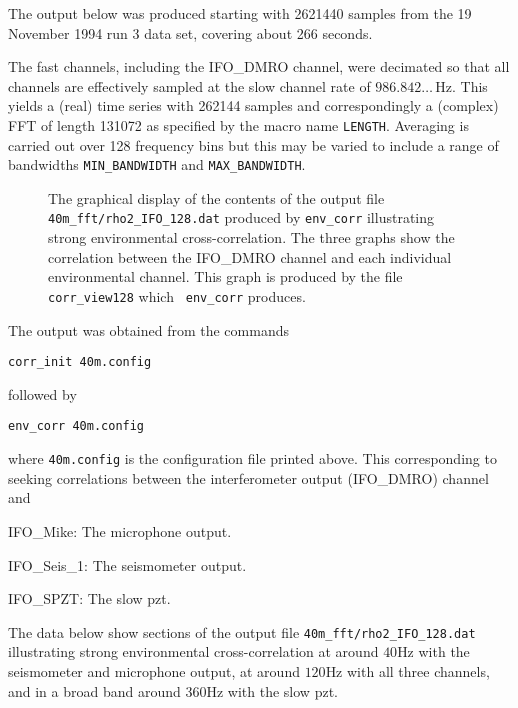  

The output below was produced starting with  2621440 samples from the 19
November 1994 run 3 data set, covering about 266 seconds.

The fast channels, including the IFO\_DMRO channel, were decimated
so that all channels are effectively sampled at the slow channel rate
of $986.842\dots\,$Hz. This yields a (real) time series with 262144
samples and correspondingly a (complex) FFT of length 131072 as
specified by the macro name {\tt LENGTH}.
Averaging is carried out over 128 frequency bins but this may
be varied to include a range of bandwidths  {\tt MIN\_BANDWIDTH} and {\tt MAX\_BANDWIDTH}. 

\begin{figure}[ht]
\begin{center}
\caption{ \label{f:rho2} The graphical display of the contents of the 
output file  {\tt 40m\_fft/rho2\_IFO\_128.dat} produced by {\tt env\_corr}
illustrating strong environmental cross-correlation.  
 The three graphs show the correlation between the
IFO\_DMRO channel and each individual environmental channel.
This graph is produced by the file {\tt corr\_view128} which {\tt
  env\_corr} produces.}

\end{center}
\end{figure}


The output was obtained from the commands

\centerline{\tt corr\_init 40m.config}

\noindent followed by

\centerline{\tt env\_corr 40m.config}

\noindent where  {\tt 40m.config} is the configuration file printed above.
This corresponding to seeking correlations between the
interferometer output (IFO\_DMRO) channel and 
\begin{description}
\item{IFO\_Mike:} The microphone output.
\item{IFO\_Seis\_1:} The seismometer output.
\item{IFO\_SPZT:} The slow pzt.
\end{description}

The data below show sections of the output file  {\tt 40m\_fft/rho2\_IFO\_128.dat}
illustrating strong environmental cross-correlation
at around $40$Hz with the seismometer and microphone output, at 
around $120$Hz with all three channels, and in a broad band 
around 360Hz with the slow pzt.


